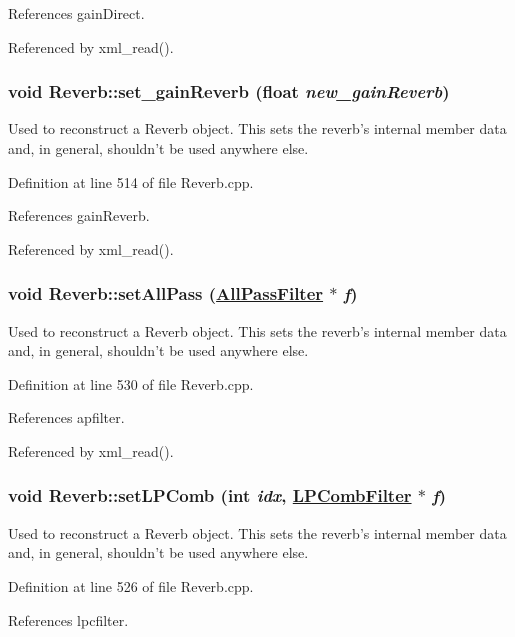 References gain\-Direct.

Referenced by xml\_\-read().\hypertarget{classReverb_a14}{
\subsubsection[set\_\-gainReverb]{\setlength{\rightskip}{0pt plus 5cm}void Reverb::set\_\-gain\-Reverb (float {\em new\_\-gain\-Reverb})}}
\label{classReverb_a14}


Used to reconstruct a Reverb object. This sets the reverb's internal member data and, in general, shouldn't be used anywhere else. 

Definition at line 514 of file Reverb.cpp.

References gain\-Reverb.

Referenced by xml\_\-read().\hypertarget{classReverb_a18}{
\subsubsection[setAllPass]{\setlength{\rightskip}{0pt plus 5cm}void Reverb::set\-All\-Pass (\hyperlink{classAllPassFilter}{All\-Pass\-Filter} $\ast$ {\em f})}}
\label{classReverb_a18}


Used to reconstruct a Reverb object. This sets the reverb's internal member data and, in general, shouldn't be used anywhere else. 

Definition at line 530 of file Reverb.cpp.

References apfilter.

Referenced by xml\_\-read().\hypertarget{classReverb_a17}{
\subsubsection[setLPComb]{\setlength{\rightskip}{0pt plus 5cm}void Reverb::set\-LPComb (int {\em idx}, \hyperlink{classLPCombFilter}{LPComb\-Filter} $\ast$ {\em f})}}
\label{classReverb_a17}


Used to reconstruct a Reverb object. This sets the reverb's internal member data and, in general, shouldn't be used anywhere else. 

Definition at line 526 of file Reverb.cpp.

References lpcfilter.

